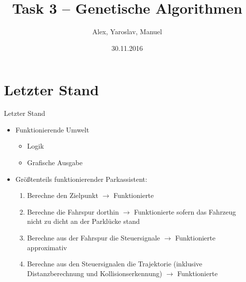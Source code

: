 \documentclass[12pt]{beamer}
\title{Task 3 -- Genetische Algorithmen}
\institute{EvoTest}
\author{Alex, Yaroslav, Manuel}
\date{30.11.2016}
\begin{document}
\maketitle 

\section{Letzter Stand}
\begin{frame}{Letzter Stand}
\begin{itemize}
	\item Funktionierende Umwelt
	\begin{itemize}
		\item Logik
		\item Grafische Ausgabe
	\end{itemize}
	\item Größtenteils funktionierender Parkassistent:
	\begin{enumerate}
		\item Berechne den Zielpunkt $\rightarrow$ Funktionierte
		\item Berechne die Fahrspur dorthin $\rightarrow$ Funktionierte sofern das Fahrzeug nicht zu dicht an der Parklücke stand
		\item Berechne aus der Fahrspur die Steuersignale $\rightarrow$ Funktionierte approximativ
		\item Berechne aus den Steuersignalen die Trajektorie (inklusive Distanzberechnung und Kollisionserkennung) $\rightarrow$ Funktionierte
	\end{enumerate}
\end{itemize}
\end{frame}
\end{document}
